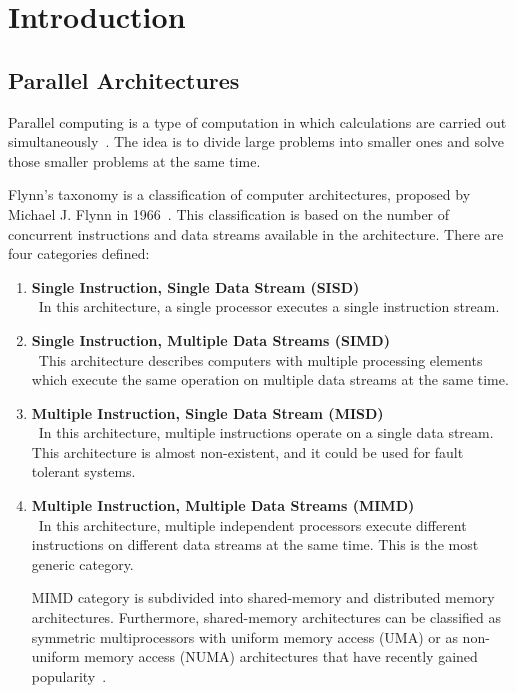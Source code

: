 \chapter{Introduction}
\label{sec:Introduction}

\section{Parallel Architectures}
\label{sec:Introduction}

Parallel computing is a type of computation in which calculations are carried out simultaneously~\cite{Almasi:1989:HPC:160438}. The idea is to divide large problems into smaller ones and solve those smaller problems at the same time.

Flynn's taxonomy is a classification of computer architectures, proposed by Michael J. Flynn in 1966~\cite{5009071,44900}. This classification is based on the number of concurrent instructions and data streams available in the architecture.
There are four categories defined:

\begin{enumerate}
  \item \textbf{Single Instruction, Single Data Stream (SISD)}\\\
    In this architecture, a single processor executes a single instruction stream.
  \item \textbf{Single Instruction, Multiple Data Streams (SIMD)}\\\
    This architecture describes computers with multiple processing elements which execute the same operation on multiple data streams at the same time.
  \item \textbf{Multiple Instruction, Single Data Stream (MISD)}\\\
    In this architecture, multiple instructions operate on a single data stream. This architecture is almost non-existent, and it could be used for fault tolerant systems.
  \item \textbf{Multiple Instruction, Multiple Data Streams (MIMD)}\\\
    In this architecture, multiple independent processors execute different instructions on different data streams at the same time. This is the most generic category.
    
    MIMD category is subdivided into shared-memory and distributed memory architectures. Furthermore, shared-memory architectures can be classified as symmetric multiprocessors with uniform memory access (UMA) or as non-uniform memory access (NUMA) architectures that have recently gained popularity~\cite{kshemkalyani2008distributed,sutter2005free}.

\end{enumerate}


